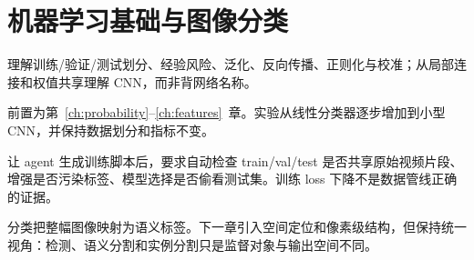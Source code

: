 \chapter{机器学习基础与图像分类}
\label{ch:ml-classification}

\begin{learningobjectives}
理解训练/验证/测试划分、经验风险、泛化、反向传播、正则化与校准；从局部连接和权值共享理解 CNN，而非背网络名称。
\end{learningobjectives}

\begin{prerequisites}
前置为第~\ref{ch:probability}--\ref{ch:features}~章。实验从线性分类器逐步增加到小型 CNN，并保持数据划分和指标不变。
\end{prerequisites}


\begin{aiverify}
让 agent 生成训练脚本后，要求自动检查 train/val/test 是否共享原始视频片段、增强是否污染标签、模型选择是否偷看测试集。训练 loss 下降不是数据管线正确的证据。
\end{aiverify}

\begin{chaptertransition}
分类把整幅图像映射为语义标签。下一章引入空间定位和像素级结构，但保持统一视角：检测、语义分割和实例分割只是监督对象与输出空间不同。
\end{chaptertransition}

